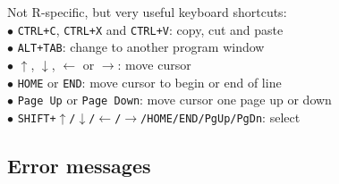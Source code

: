 \documentclass[a4paper,11pt,twocolumn,tablecaptionabove]{scrartcl} %
\begin{document}
\noindent Not R-specific, but very useful keyboard shortcuts:\\
$\bullet$ \texttt{CTRL+C}, \texttt{CTRL+X} and \texttt{CTRL+V}: copy, cut and paste\\
$\bullet$ \texttt{ALT+TAB}: change to another program window\\
$\bullet$ $\uparrow$, $\downarrow$, $\leftarrow$ or $\rightarrow$: move cursor\\
$\bullet$ \texttt{HOME} or \texttt{END}: move cursor to begin or end of line\\
$\bullet$ \texttt{Page Up} or \texttt{Page Down}: move cursor one page up or down\\
$\bullet$ \texttt{SHIFT+$\uparrow$/$\downarrow$/$\leftarrow$/$\rightarrow$/HOME/END/PgUp/PgDn}: select\\

\subsection{Error messages}
\end{document}
